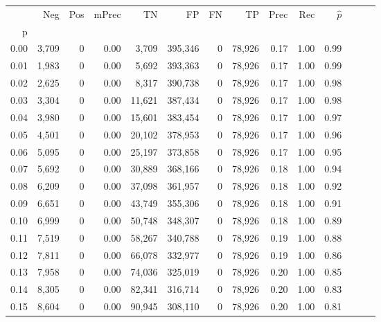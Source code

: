 \begin{tabular}{rrrrrrrrrrrrrr}
\toprule
{} &    Neg &    Pos & mPrec &       TN &       FP &      FN &      TP &  Prec &   Rec & $\hat{p}$ \\
p    &        &        &       &          &          &         &         &       &       &           \\
\midrule
0.00 &  3,709 &      0 &  0.00 &    3,709 &  395,346 &       0 &  78,926 &  0.17 &  1.00 &      0.99 \\
0.01 &  1,983 &      0 &  0.00 &    5,692 &  393,363 &       0 &  78,926 &  0.17 &  1.00 &      0.99 \\
0.02 &  2,625 &      0 &  0.00 &    8,317 &  390,738 &       0 &  78,926 &  0.17 &  1.00 &      0.98 \\
0.03 &  3,304 &      0 &  0.00 &   11,621 &  387,434 &       0 &  78,926 &  0.17 &  1.00 &      0.98 \\
0.04 &  3,980 &      0 &  0.00 &   15,601 &  383,454 &       0 &  78,926 &  0.17 &  1.00 &      0.97 \\
0.05 &  4,501 &      0 &  0.00 &   20,102 &  378,953 &       0 &  78,926 &  0.17 &  1.00 &      0.96 \\
0.06 &  5,095 &      0 &  0.00 &   25,197 &  373,858 &       0 &  78,926 &  0.17 &  1.00 &      0.95 \\
0.07 &  5,692 &      0 &  0.00 &   30,889 &  368,166 &       0 &  78,926 &  0.18 &  1.00 &      0.94 \\
0.08 &  6,209 &      0 &  0.00 &   37,098 &  361,957 &       0 &  78,926 &  0.18 &  1.00 &      0.92 \\
0.09 &  6,651 &      0 &  0.00 &   43,749 &  355,306 &       0 &  78,926 &  0.18 &  1.00 &      0.91 \\
0.10 &  6,999 &      0 &  0.00 &   50,748 &  348,307 &       0 &  78,926 &  0.18 &  1.00 &      0.89 \\
0.11 &  7,519 &      0 &  0.00 &   58,267 &  340,788 &       0 &  78,926 &  0.19 &  1.00 &      0.88 \\
0.12 &  7,811 &      0 &  0.00 &   66,078 &  332,977 &       0 &  78,926 &  0.19 &  1.00 &      0.86 \\
0.13 &  7,958 &      0 &  0.00 &   74,036 &  325,019 &       0 &  78,926 &  0.20 &  1.00 &      0.85 \\
0.14 &  8,305 &      0 &  0.00 &   82,341 &  316,714 &       0 &  78,926 &  0.20 &  1.00 &      0.83 \\
0.15 &  8,604 &      0 &  0.00 &   90,945 &  308,110 &       0 &  78,926 &  0.20 &  1.00 &      0.81 \\

\end{tabular}
